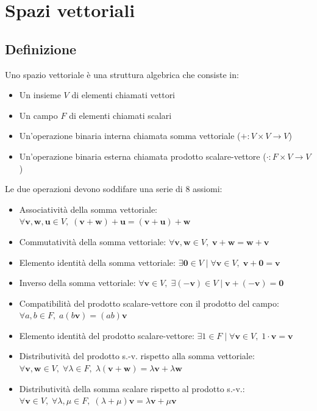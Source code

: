 \documentclass{article}
\begin{document}
\setlength{\parindent}{0pt}

\section{Spazi vettoriali}
\subsection{Definizione}
    Uno spazio vettoriale è una struttura algebrica che consiste in: 
    \begin{itemize}
        \item Un insieme $V$ di elementi chiamati vettori 
        \item Un campo $F$ di elementi chiamati scalari 
        \item Un'operazione binaria interna chiamata somma vettoriale ($+ : V \times V \rightarrow V$)
        \item Un'operazione binaria esterna chiamata prodotto scalare-vettore ($\cdot : F \times V \rightarrow V$)
    \end{itemize} 

    \vspace{10pt}
    Le due operazioni devono soddifare una serie di 8 assiomi:
    \begin{itemize}
        \item Associatività della somma vettoriale: $ \forall \mathbf{v},\mathbf{w},\mathbf{u} \in V, \; (\mathbf{v} + \mathbf{w}) + \mathbf{u} = (\mathbf{v} + \mathbf{u}) + \mathbf{w} $  
        \item Commutatività della somma vettoriale: $ \forall \mathbf{v},\mathbf{w} \in V, \; \mathbf{v} + \mathbf{w} = \mathbf{w} + \mathbf{v} $
        \item Elemento identità della somma vettoriale: $ \exists \mathbf{0} \in V \; | \; \forall \mathbf{v} \in V,  \; \mathbf{v} + \mathbf{0} = \mathbf{v} $ 
        \item Inverso della somma vettoriale: $ \forall \mathbf{v} \in V, \; \exists (-\mathbf{v}) \in V \; | \; \mathbf{v} + (-\mathbf{v}) = \mathbf{0} $ 
        \item Compatibilità del prodotto scalare-vettore con il prodotto del campo: $ \forall a, b \in F, \;  a(b\mathbf{v}) = (ab)\mathbf{v} $
        \item Elemento identità del prodotto scalare-vettore: $ \exists 1 \in F \; | \; \forall \mathbf{v} \in V, \; 1 \cdot \mathbf{v} = \mathbf{v} $
        \item Distributività del prodotto s.-v. rispetto alla somma vettoriale: $ \forall \mathbf{v}, \mathbf{w} \in V, \; \forall \lambda \in F, \; \lambda(\mathbf{v} + \mathbf{w}) = \lambda\mathbf{v} + \lambda\mathbf{w}$
        \item Distributività della somma scalare rispetto al prodotto s.-v.: $ \forall \mathbf{v} \in V, \; \forall \lambda,\mu \in F, \; (\lambda + \mu)\mathbf{v} = \lambda\mathbf{v} + \mu\mathbf{v} $
    \end{itemize}
\end{document}
